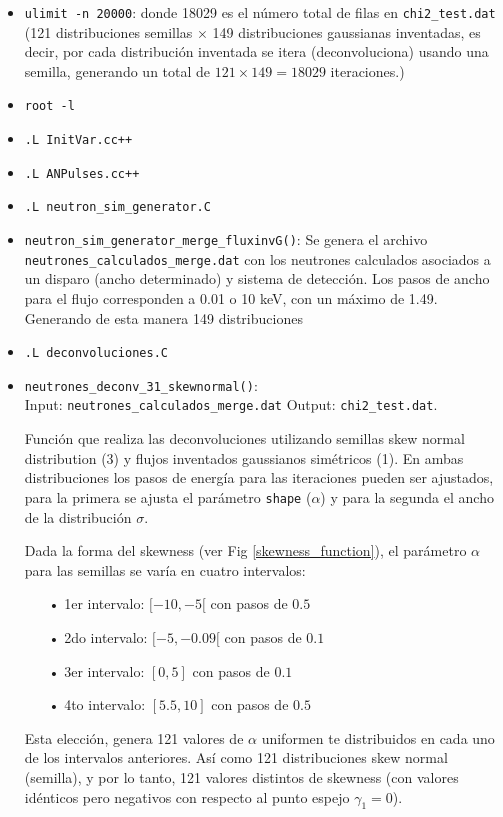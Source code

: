 \documentclass[11pt,letterpaper]{article}
\begin{document}
\begin{itemize}
\item \verb|ulimit -n 20000|: donde 18029  es el número total de filas en \verb|chi2_test.dat| (121 distribuciones semillas $\times$ 149 distribuciones gaussianas inventadas, es decir, por cada distribución inventada se itera (deconvoluciona) usando una semilla, generando un total de $121 \times 149=18029$ iteraciones.)
\item \verb|root -l|
\item \verb|.L InitVar.cc++|
\item \verb|.L ANPulses.cc++|
\item \verb|.L neutron_sim_generator.C|
\item \verb|neutron_sim_generator_merge_fluxinvG()|: Se genera el archivo \verb|neutrones_calculados_merge.dat| con los neutrones calculados asociados a un disparo (ancho determinado) y sistema de detección. Los pasos de ancho para el flujo corresponden a 0.01 o 10 keV, con un máximo de 1.49. Generando de esta manera 149 distribuciones
\item \verb|.L deconvoluciones.C|
\item \verb|neutrones_deconv_31_skewnormal()|: \\
Input: \verb|neutrones_calculados_merge.dat| Output:  \verb|chi2_test.dat|.

Función que realiza las deconvoluciones utilizando semillas skew normal distribution (3) y flujos inventados gaussianos simétricos (1). En ambas distribuciones los pasos de energía para las iteraciones pueden ser ajustados, para la primera se ajusta el parámetro \verb|shape| ($\alpha$) y para la segunda el ancho de la distribución $\sigma$.
 
Dada la forma del skewness (ver Fig \ref{skewness_function}), el parámetro $\alpha$ para las semillas se varía en cuatro intervalos:

\begin{itemize}
\item[•] 1er intervalo: $[-10,-5[$ con pasos de $0.5$
\item[•] 2do intervalo: $[-5,-0.09[$ con pasos de $0.1$
\item[•] 3er intervalo: $[0,5]$ con pasos de $0.1$
\item[•] 4to intervalo: $[5.5,10]$ con pasos de $0.5$
\end{itemize}

Esta elección, genera 121 valores de $\alpha$ uniformen te distribuidos en cada uno de los intervalos anteriores. Así como 121 distribuciones skew normal (semilla), y por lo tanto, 121 valores distintos de skewness (con valores idénticos pero negativos con respecto al punto espejo $\gamma_1 = 0$).


\end{itemize}
\end{document}
